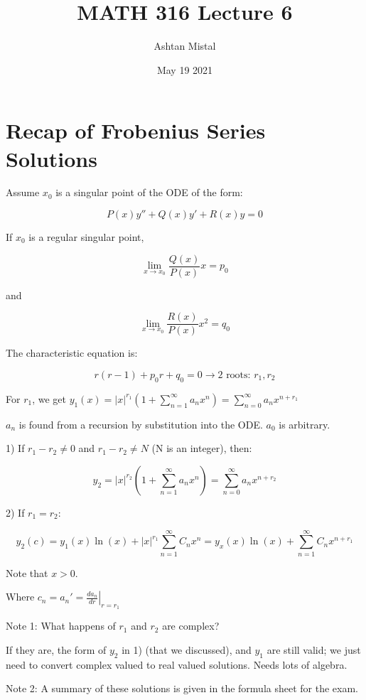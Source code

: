 \documentclass{article}
\title{MATH 316 Lecture 6}
\author{Ashtan Mistal}
\date{May 19 2021}
\begin{document}
\ifstandalone
\maketitle
\fi

\graphicspath{{./Lecture06/}}

\section{Recap of Frobenius Series Solutions}

Assume $x_0$ is a singular point of the ODE of the form:

$$P(x) y'' + Q(x) y' + R(x) y = 0$$

If $x_0$ is a regular singular point,

$$\lim_{x \to x_0} \frac{Q(x)}{P(x)} x = p_0$$

and

$$\lim_{x \to x_0} \frac{R(x)}{P(x)} x^2 = q_0$$

The characteristic equation is:

$$r(r-1) + p_0 r + q_0 = 0 \longrightarrow \text{2 roots: } r_1, r_2$$

For $r_1$, we get $y_1(x) = |x|^{r_1} \left( 1 + \sum_{n= 1}^{\infty} a_n x^n \right) = \sum_{n = 0}^\infty a_n x^{n + r_1}$

$a_n$ is found from a recursion by substitution into the ODE. $a_0$ is arbitrary. 

\hfill

1) If $r_1 - r_2 \neq 0$ and $r_1 - r_2 \neq N$ (N is an integer), then:

$$y_2 = |x|^{r_2} \left(1 + \sum_{n = 1}^\infty a_n x^n \right) = \sum_{n = 0}^\infty a_n x^{n + r_2}$$

2) If $r_1 = r_2$:

$$y_2(c) = y_1 (x) \ln(x) + |x| ^{r_1} \sum_{n = 1}^\infty C_n x^n = y_x(x) \ln(x) + \sum_{n = 1}^\infty C_n x^{n + r_1}$$

Note that $x > 0$. 

\hfill

Where $c_n = a_n ' = \left. \frac{d a_n}{dr} \right|_{r = r_1}$


Note 1: What happens of $r_1$ and $r_2$ are complex?

If they are, the form of $y_2$ in 1) (that we discussed), and $y_1$ are still valid; we just need to convert complex valued to real valued solutions. Needs lots of algebra. 

Note 2: A summary of these solutions is given in the formula sheet for the exam. 
\end{document}

